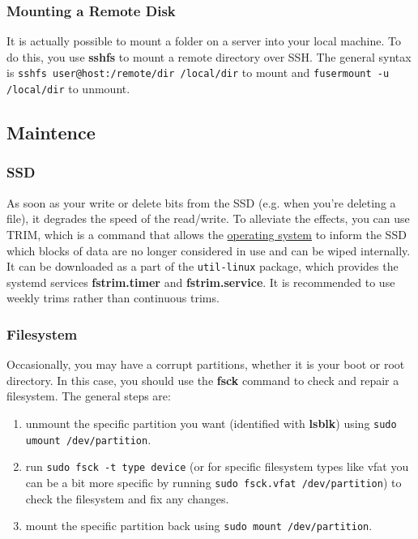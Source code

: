 \documentclass{article}
\begin{document}
    \subsubsection{Mounting a Remote Disk} 

      It is actually possible to mount a folder on a server into your local machine. To do this, you use \textbf{sshfs} to mount a remote directory over SSH. The general syntax is \texttt{sshfs user@host:/remote/dir /local/dir} to mount and \texttt{fusermount -u /local/dir} to unmount. 

  \subsection{Maintence} 

    \subsubsection{SSD}

      As soon as your write or delete bits from the SSD (e.g. when you're deleting a file), it degrades the speed of the read/write. To alleviate the effects, you can use TRIM, which is a command that allows the \hyperref[def:operating-system]{operating system} to inform the SSD which blocks of data are no longer considered in use and can be wiped internally. It can be downloaded as a part of the \texttt{util-linux} package, which provides the systemd services \textbf{fstrim.timer} and \textbf{fstrim.service}. It is recommended to use weekly trims rather than continuous trims. 

    \subsubsection{Filesystem} 

      Occasionally, you may have a corrupt partitions, whether it is your boot or root directory. In this case, you should use the \textbf{fsck} command to check and repair a filesystem. The general steps are: 
      \begin{enumerate} 
        \item unmount the specific partition you want (identified with \textbf{lsblk}) using \texttt{sudo umount /dev/partition}. 
        \item run \texttt{sudo fsck -t type device} (or for specific filesystem types like vfat you can be a bit more specific by running \texttt{sudo fsck.vfat /dev/partition}) to check the filesystem and fix any changes. 
        \item mount the specific partition back using \texttt{sudo mount /dev/partition}. 
      \end{enumerate}
\end{document}
